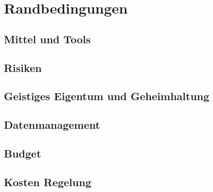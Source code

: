 \chapter{Randbedingungen}

\section{Mittel und Tools}
\section{Risiken}
\section{Geistiges Eigentum und Geheimhaltung}
\section{Datenmanagement}
\section{Budget}
\section{Kosten Regelung}
